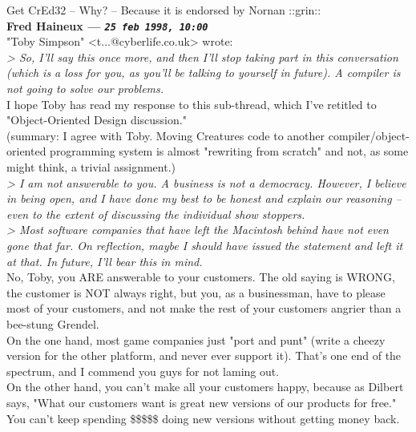 \documentclass[11pt,twoside,a4paper]{article}
\begin{document}
\begin{multicols*}{2}
Get CrEd32 -- Why? -- Because it is endorsed by Nornan ::grin::~\\

		
\textbf{Fred Haineux --- \emph{\texttt{25 feb 1998, 10:00}}}~\\

"Toby Simpson" <t...@cyberlife.co.uk> wrote:~\\
\emph{> So, I'll say this once more, and then I'll stop taking part in this conversation (which is a loss for you, as you'll be talking to yourself in future). A compiler is not going to solve our problems.}~\\

I hope Toby has read my response to this sub-thread, which I've retitled to "Object-Oriented Design discussion."~\\

(summary: I agree with Toby. Moving Creatures code to another compiler/object-oriented programming system is almost "rewriting from scratch" and not, as some might think, a trivial assignment.)~\\

\emph{> I am not answerable to you. A business is not a democracy. However, I believe in being open, and I have done my best to be honest and explain our reasoning -- even to the extent of discussing the individual show stoppers.}~\\
\emph{> Most software companies that have left the Macintosh behind have not even gone that far. On reflection, maybe I should have issued the statement and left it at that. In future, I'll bear this in mind.}~\\

No, Toby, you ARE answerable to your customers. The old saying is WRONG, the customer is NOT always right, but you, as a businessman, have to please most of your customers, and not make the rest of your customers angrier than a bee-stung Grendel.~\\

On the one hand, most game companies just "port and punt" (write a cheezy version for the other platform, and never ever support it). That's one end of the spectrum, and I commend you guys for not laming out.~\\

On the other hand, you can't make all your customers happy, because as Dilbert says, "What our customers want is great new versions of our products for free." You can't keep spending \$\$\$\$\$ doing new versions without getting money back.~\\


\end{multicols*}
\end{document}
